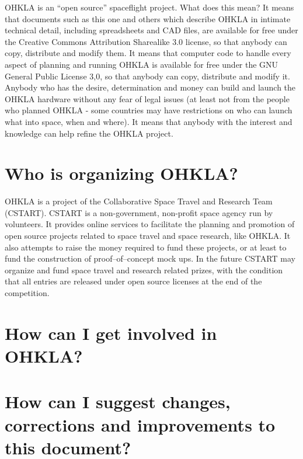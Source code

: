 \documentclass{report}
\begin{document}
OHKLA is an ``open source'' spaceflight project.  What does this mean?  It means that documents such as this one and others which describe OHKLA in intimate technical detail, including spreadsheets and CAD files, are available for free under the Creative Commons Attribution Sharealike 3.0 license, so that anybody can copy, distribute and modify them.  It means that computer code to handle every aspect of planning and running OHKLA is available for free under the GNU General Public License 3,0, so that anybody can copy, distribute and modify it.  Anybody who has the desire, determination and money can build and launch the OHKLA hardware without any fear of legal issues (at least not from the people who planned OHKLA - some countries may have restrictions on who can launch what into space, when and where).  It means that anybody with the interest and knowledge can help refine the OHKLA project.

\section{Who is organizing OHKLA?}

OHKLA is a project of the Collaborative Space Travel and Research Team (CSTART).  CSTART is a non-government, non-profit space agency run by volunteers.  It provides online services to facilitate the planning and promotion of open source projects related to space travel and space research, like OHKLA.  It also attempts to raise the money required to fund these projects, or at least to fund the construction of proof--of--concept mock ups.  In the future CSTART may organize and fund space travel and research related prizes, with the condition that all entries are released under open source licenses at the end of the competition.

\section{How can I get involved in OHKLA?}


\section{How can I suggest changes, corrections and improvements to this document?}
\end{document}
